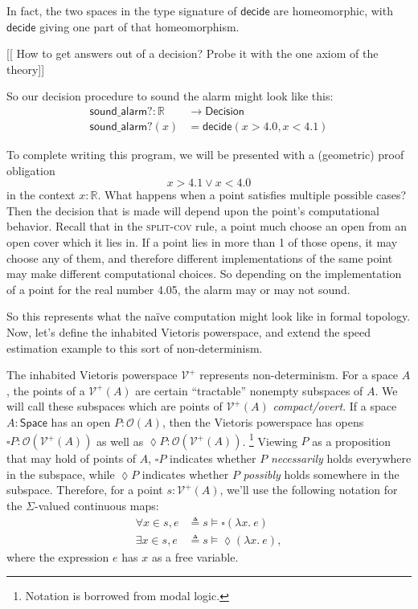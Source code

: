 \documentclass{article}           %
\newcommand{\R}{\mathbb{R}}
\newcommand{\fun}[2]{\lambda {#1}.\  {#2}}
\newcommand{\Open}[1]{\mathcal{O}({#1})}
\newcommand{\irule}[1]{\textsc{#1}}
\newcommand{\Space}{\mathsf{Space}}
\newcommand{\Viet}{{\mathcal{V}^+}}
\newcommand{\defeq}{\triangleq}
\begin{document}
In fact, the two spaces in the type signature of $\mathsf{decide}$ are homeomorphic, with $\mathsf{decide}$ giving one part of that homeomorphism.

[[ How to get answers out of a decision? Probe it with the one axiom of the theory]]

So our decision procedure to sound the alarm might look like this:
\begin{align*}
\mathsf{sound\_alarm?} : \R &\to \mathsf{Decision}
\\ \mathsf{sound\_alarm?}(x) &= \mathsf{decide}(x > 4.0, x < 4.1)
\end{align*}

To complete writing this program, we will be presented with a (geometric) proof obligation
\[
x > 4.1 \vee x < 4.0
\]
in the context $x : \R$. What happens when a point satisfies multiple possible cases? Then the decision that is made will depend upon the point's computational behavior. Recall that in the \irule{split-cov} rule, a point much choose an open from an open cover which it lies in. If a point lies in more than 1 of those opens, it may choose any of them, and therefore different implementations of the same point may make different computational choices. So depending on the implementation of a point for the real number 4.05, the alarm may or may not sound.

So this represents what the naïve computation might look like in formal topology. Now, let's define the inhabited Vietoris powerspace, and extend the speed estimation example to this sort of non-determinism.

The inhabited Vietoris powerspace $\Viet$ represents non-determinism. For a space $A$, the points of a $\Viet(A)$ are certain ``tractable'' nonempty subspaces of $A$. We will call these subspaces which are points of $\Viet(A)$ \emph{compact/overt}. If a space $A : \Space$ has an open $P : \Open{A}$, then the Vietoris powerspace has opens $\square P : \Open{\Viet(A)}$ as well as $\lozenge P : \Open{\Viet(A)}$. \footnote{Notation is borrowed from modal logic.} Viewing $P$ as a proposition that may hold of points of $A$, $\square P$ indicates whether $P$ \emph{necessarily} holds everywhere in the subspace, while $\lozenge P$ indicates whether $P$ \emph{possibly} holds somewhere in the subspace. Therefore, for a point $s : \Viet(A)$, we'll use the following notation for the $\Sigma$-valued continuous maps:
\begin{align*}
\forall x \in s, e &\defeq s \models \square (\fun{x}{e})
\\ \exists x \in s, e &\defeq s \models \lozenge (\fun{x}{e}),
\end{align*}
where the expression $e$ has $x$ as a free variable. 
\end{document}
